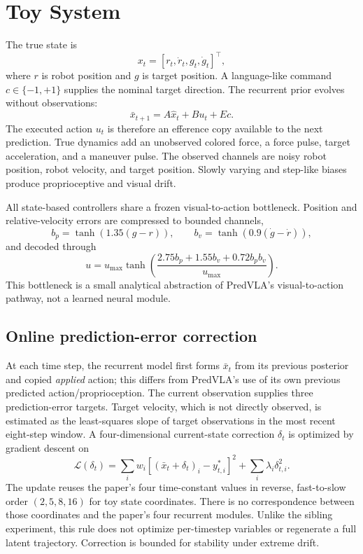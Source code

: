 \documentclass[11pt]{article}
\begin{document}
\section{Toy System}

The true state is
\[
x_t=[r_t,\dot r_t,g_t,\dot g_t]^\top,
\]
where $r$ is robot position and $g$ is target position. A language-like command $c\in\{-1,+1\}$ supplies the nominal target direction. The recurrent prior evolves without observations:
\[
\bar x_{t+1}=A\hat x_t+B u_t+E c.
\]
The executed action $u_t$ is therefore an efference copy available to the next prediction. True dynamics add an unobserved colored force, a force pulse, target acceleration, and a maneuver pulse. The observed channels are noisy robot position, robot velocity, and target position. Slowly varying and step-like biases produce proprioceptive and visual drift.

All state-based controllers share a frozen visual-to-action bottleneck. Position and relative-velocity errors are compressed to bounded channels,
\[
b_p=\tanh(1.35(g-r)),\qquad b_v=\tanh(0.9(\dot g-\dot r)),
\]
and decoded through
\[
u=u_{\max}\tanh\!\left(\frac{2.75b_p+1.55b_v+0.72b_pb_v}{u_{\max}}\right).
\]
This bottleneck is a small analytical abstraction of PredVLA's visual-to-action pathway, not a learned neural module.

\subsection{Online prediction-error correction}

At each time step, the recurrent model first forms $\bar x_t$ from its previous posterior and copied \emph{applied} action; this differs from PredVLA's use of its own previous predicted action/proprioception. The current observation supplies three prediction-error targets. Target velocity, which is not directly observed, is estimated as the least-squares slope of target observations in the most recent eight-step window. A four-dimensional current-state correction $\delta_t$ is optimized by gradient descent on
\[
\mathcal L(\delta_t)=
\sum_i w_i\left[(\bar x_t+\delta_t)_i-y_{t,i}^{*}\right]^2+
\sum_i\lambda_i\delta_{t,i}^2.
\]
The update reuses the paper's four time-constant values in reverse, fast-to-slow order $(2,5,8,16)$ for toy state coordinates. There is no correspondence between those coordinates and the paper's four recurrent modules. Unlike the sibling  experiment, this rule does not optimize per-timestep variables or regenerate a full latent trajectory. Correction is bounded for stability under extreme drift.
\end{document}
